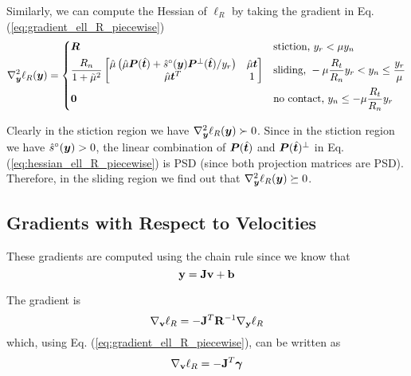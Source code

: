 Similarly, we can compute the Hessian of $\ell_R$ by taking the gradient in Eq.
(\ref{eq:gradient_ell_R_piecewise})
\begin{equation}
	\nabla_\vf{y}^2\ell_R(\vf{y}) = 
\begin{dcases}
	\vf{R} & 
	\text{stiction, } y_r < \mu y_n\\
	\frac{R_n}{1+\tilde\mu^2}
	\begin{bmatrix}
		\hat{\mu}\left(\hat{\mu}\vf{P}(\hat{\vf{t}})+\hat{s}^\circ(\vf{y})\vf{P}^\perp(\hat{\vf{t}})/y_r\right) & 
		\hat{\mu}\vf{t}\\
		\hat{\mu}\vf{t}^T & 
		1\\
	\end{bmatrix} &
	\text{sliding, } -\mu \frac{R_t}{R_n} y_r < y_n \leq \frac{y_r}{\mu}\\
    \vf{0} & \text{no contact, } y_n \leq -\mu \frac{R_t}{R_n} y_r
\end{dcases}	  
	\label{eq:hessian_ell_R_piecewise}
\end{equation}

Clearly in the stiction region we have $\nabla_{\bm{y}}^2\ell_R({\bm{y}})\succ 0$.
Since in the stiction region we have $\hat{s}^\circ({\bm{y}})>0$, the linear
combination of ${\bm{P}}(\hat{{\bm{t}}})$ and ${\bm{P}}(\hat{{\bm{t}}})^\perp$ in Eq.
(\ref{eq:hessian_ell_R_piecewise}) is PSD (since both projection matrices are
PSD). Therefore, in the sliding region we find out that
$\nabla_{\bm{y}}^2\ell_R({\bm{y}})\succeq 0$.

\subsection{Gradients with Respect to Velocities}
These gradients are computed using the chain rule since we know that
\begin{equation}
	{\mathbf{y}}={\mathbf{Jv+b}}
\end{equation}

The gradient is
\begin{equation}
	\nabla_\mf{v}\ell_R = -\mf{J}^T\mf{R}^{-1}\nabla_\mf{y}\ell_R
	\label{eq:ell_velocity_gradient}
\end{equation}
which, using Eq. (\ref{eq:gradient_ell_R_piecewise}), can be written as
\begin{equation}
	\nabla_\mf{v}\ell_R = -\mf{J}^T\bgamma
	\label{eq:ell_velocity_gradient_simplified}
\end{equation}


